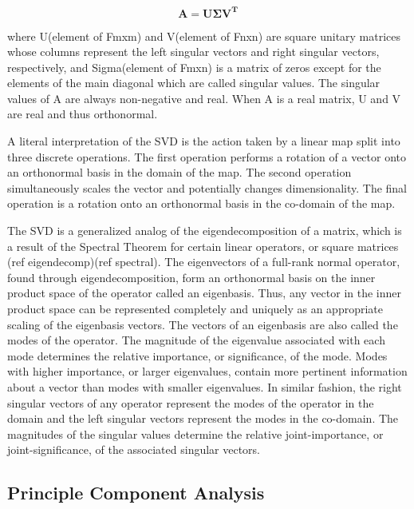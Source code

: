 \documentclass[conference]{IEEEtran}
\begin{document}
     \begin{equation*}{\mathbf{A}} = {\mathbf{U\Sigma }}{{\mathbf{V}}^{\mathbf{T}}}\tag{2}\end{equation*}

    where U(element of Fmxm) and V(element of Fnxn) are square unitary
    matrices whose columns represent the left singular vectors and right singular vectors, respectively, and Sigma(element of Fmxn) is a matrix of zeros except for the elements of the main diagonal which are called singular values. The singular values of A are always non-negative and real. When A is a real matrix, U and V are real and thus orthonormal.

    A literal interpretation of the SVD is the action taken by a linear map split into three discrete operations. The first operation performs a rotation of a vector onto an orthonormal basis in the domain of the map. The second operation simultaneously scales the vector and potentially changes dimensionality. The final operation is a rotation onto an orthonormal basis in the co-domain of the map.

    The SVD is a generalized analog of the eigendecomposition of a matrix, which is a result of the Spectral Theorem for certain linear operators, or square matrices (ref eigendecomp)(ref spectral). The eigenvectors of a full-rank normal operator, found through eigendecomposition, form an orthonormal basis on the inner product space of the operator called an eigenbasis. Thus, any vector in the inner product space can be represented completely and uniquely as an appropriate scaling of the eigenbasis vectors. The vectors of an eigenbasis are also called the modes of the operator. The magnitude of the eigenvalue associated with each mode determines the relative importance, or significance, of the mode. Modes with higher importance, or larger eigenvalues, contain more pertinent information about a vector than modes with smaller eigenvalues. In similar fashion, the right singular vectors of any operator represent the modes of the operator in the domain and the left singular vectors represent the modes in the co-domain. The magnitudes of the singular values determine the relative joint-importance, or joint-significance, of the associated singular vectors.
    
    \subsection{Principle Component Analysis}
    
\end{document}

